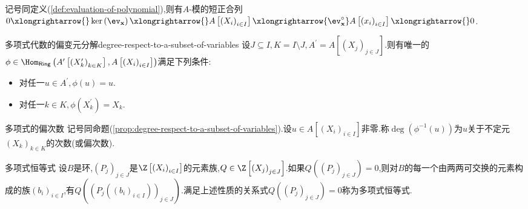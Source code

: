\begin{proposition}{}{}
	记号同定义(\cref{def:evaluation-of-polynomial}),则有$A$-模的短正合列$0\xlongrightarrow{}\ker\left(\ev_{\mathbf{x}}\right)\xlongrightarrow{}A\left[\left(X_{i}\right)_{i\in I}\right]\xlongrightarrow{\ev_{\mathbf{x}}^{\circ}}A\left[\left(x_{i}\right)_{i\in I}\right]\xlongrightarrow{}0$.
\end{proposition}

\begin{proposition}{多项式代数的偏变元分解}{degree-respect-to-a-subset-of-variables}
	设$J\subseteq I,K=I\setminus J,A^{\prime}=A\left[\left(X_{j}\right)_{j\in J}\right]$.则有唯一的$\phi\in\Hom_{\mathsf{Ring}}\left(A^{\prime}\left[\left(X_{k}^{\prime}\right)_{k\in K}\right],A\left[\left(X_{i}\right)_{i\in I}\right]\right)$满足下列条件:
	\begin{itemize}
		\item 对任一$u\in A^{\prime},\phi\left(u\right)=u$.
		\item 对任一$k\in K,\phi\left(X_{k}^{\prime}\right)=X_{k}$.
	\end{itemize}
\end{proposition}

\begin{definition}{多项式的偏次数}{}
	记号同命题(\cref{prop:degree-respect-to-a-subset-of-variables}).设$u\in A\left[\left(X_{i}\right)_{i\in I}\right]$非零.称$\deg\left(\phi^{-1}\left(u\right)\right)$为$u$关于不定元$\left(X_{k}\right)_{k\in K}$的次数(或偏次数).
\end{definition}

\begin{remark}{多项式恒等式}{}
	设$B$是环,$\left(P_{j}\right)_{j\in J}$是$\Z\left[\left(X_{i}\right)_{i\in I}\right]$的元素族,$Q\in\Z\left[\left(X_{j}\right)_{j\in J}\right]$.如果$Q\left(\left(P_{j}\right)_{j\in J}\right)=0$,则对$B$的每一个由两两可交换的元素构成的族$\left(b_{i}\right)_{i\in I}$,有$Q\left(\left(P_{j}\left(\left(b_{i}\right)_{i\in I}\right)\right)_{j\in J}\right)$.满足上述性质的关系式$Q\left(\left(P_{j}\right)_{j\in J}\right)=0$称为多项式恒等式.
\end{remark}


